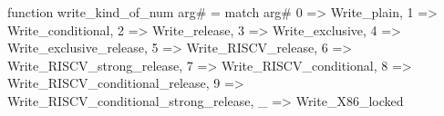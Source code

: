 function write_kind_of_num arg# = match arg# {
  0 => Write_plain,
  1 => Write_conditional,
  2 => Write_release,
  3 => Write_exclusive,
  4 => Write_exclusive_release,
  5 => Write_RISCV_release,
  6 => Write_RISCV_strong_release,
  7 => Write_RISCV_conditional,
  8 => Write_RISCV_conditional_release,
  9 => Write_RISCV_conditional_strong_release,
  _ => Write_X86_locked
}
